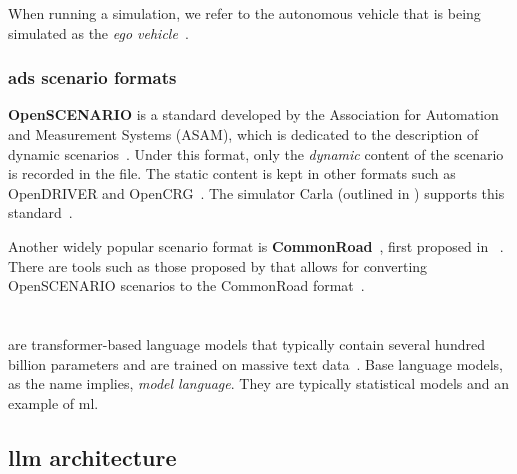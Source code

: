 When running a simulation, we refer to the autonomous vehicle that is being
simulated as the \textit{ego vehicle}~\cite{egoDefinition}.



\subsubsection{\acrshort{ads} scenario formats}\label{sec:adsScenarioFormats}

\textbf{OpenSCENARIO} is a standard developed by the Association for Automation and
Measurement Systems (ASAM), which is dedicated to the description of dynamic
scenarios~\cite[651]{generatingOpenScenario}. Under this format, only the
\textit{dynamic} content of the scenario is recorded in the file. The static
content is kept in other formats such as OpenDRIVER and
OpenCRG~\cite[652]{generatingOpenScenario}. The simulator Carla (outlined in
) supports this
standard~\cite[652]{generatingOpenScenario}.

Another widely popular scenario format is
\textbf{CommonRoad}~\cite[4941]{convOpenScenarioToCR}, first proposed in
~\cite{commonRoadOG}. There are tools such as those
proposed by \citeauthor{convOpenScenarioToCR} that allows for converting
OpenSCENARIO scenarios to the CommonRoad
format~\cite[4941]{convOpenScenarioToCR}.


\section{}

 are transformer-based language models that typically contain several hundred billion
parameters and are trained on massive text data~\cite[4]{llmSurvey}.
Base language models, as the name implies, \textit{model language}. They are typically statistical
models and an example of \acrfull{ml}.

\subsection{\acrfull{llm} architecture}\label{sec:llmArch}

